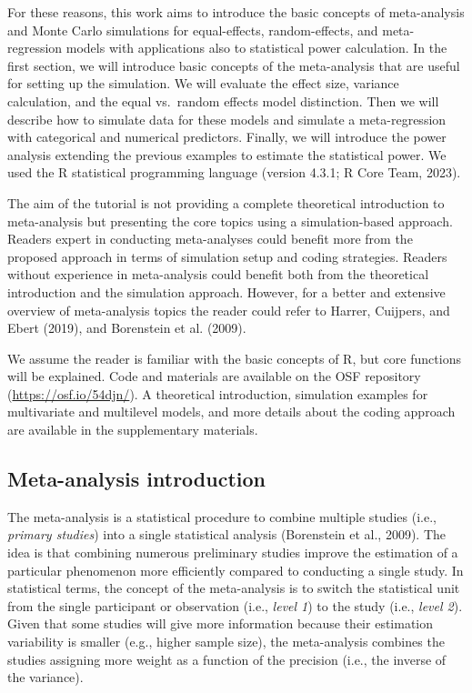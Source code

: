 \documentclass[
  man,floatsintext]{apa6}
\begin{document}
For these reasons, this work aims to introduce the basic concepts of meta-analysis and Monte Carlo simulations for equal-effects, random-effects, and meta-regression models with applications also to statistical power calculation. In the first section, we will introduce basic concepts of the meta-analysis that are useful for setting up the simulation. We will evaluate the effect size, variance calculation, and the equal vs.~random effects model distinction. Then we will describe how to simulate data for these models and simulate a meta-regression with categorical and numerical predictors. Finally, we will introduce the power analysis extending the previous examples to estimate the statistical power. We used the R statistical programming language (version 4.3.1; R Core Team, 2023).

The aim of the tutorial is not providing a complete theoretical introduction to meta-analysis but presenting the core topics using a simulation-based approach. Readers expert in conducting meta-analyses could benefit more from the proposed approach in terms of simulation setup and coding strategies. Readers without experience in meta-analysis could benefit both from the theoretical introduction and the simulation approach. However, for a better and extensive overview of meta-analysis topics the reader could refer to Harrer, Cuijpers, and Ebert (2019), and Borenstein et al. (2009).

We assume the reader is familiar with the basic concepts of R, but core functions will be explained. Code and materials are available on the OSF repository (\url{https://osf.io/54djn/}). A theoretical introduction, simulation examples for multivariate and multilevel models, and more details about the coding approach are available in the supplementary materials.

\hypertarget{meta-analysis-introduction}{%
\subsection{Meta-analysis introduction}\label{meta-analysis-introduction}}

The meta-analysis is a statistical procedure to combine multiple studies (i.e., \emph{primary studies}) into a single statistical analysis (Borenstein et al., 2009). The idea is that combining numerous preliminary studies improve the estimation of a particular phenomenon more efficiently compared to conducting a single study. In statistical terms, the concept of the meta-analysis is to switch the statistical unit from the single participant or observation (i.e., \emph{level 1}) to the study (i.e., \emph{level 2}). Given that some studies will give more information because their estimation variability is smaller (e.g., higher sample size), the meta-analysis combines the studies assigning more weight as a function of the precision (i.e., the inverse of the variance).
\end{document}
